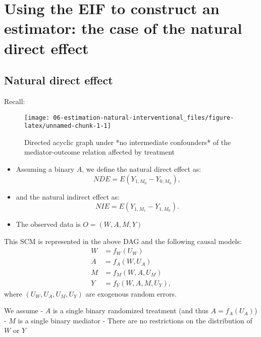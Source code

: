 \documentclass[
  12pt,
]{book}
\theoremstyle{definition}
\theoremstyle{definition}
\theoremstyle{definition}
\newcommand{\1}{\mathbbm{1}}
\begin{document}
\hypertarget{using-the-eif-to-construct-an-estimator-the-case-of-the-natural-direct-effect}{%
\chapter{Using the EIF to construct an estimator: the case of the natural direct effect}\label{using-the-eif-to-construct-an-estimator-the-case-of-the-natural-direct-effect}}

\hypertarget{natural-direct-effect}{%
\section{Natural direct effect}\label{natural-direct-effect}}

Recall:

\begin{figure}

{\centering \texttt{[image: 06-estimation-natural-interventional\_files/figure-latex/unnamed-chunk-1-1]} 

}

\caption{Directed acyclic graph under *no intermediate confounders* of the mediator-outcome relation affected by treatment}\label{fig:unnamed-chunk-1}
\end{figure}

\begin{itemize}
\item
  Assuming a binary \(A\), we define the natural direct effect as: \[NDE = E(Y_{1,M_{0}} - Y_{0,M_{0}}),\]
\item
  and the natural indirect effect as: \[NIE = E(Y_{1,M_{1}} - Y_{1,M_{0}}).\]
\item
  The observed data is \(O=(W, A, M, Y)\)
\end{itemize}

This SCM is represented in the above DAG and the following causal models:
\begin{align*}
  W & = f_W(U_W)\\
  A & = f_A(W, U_A)\\
  M & = f_M(W, A, U_M)\\
  Y & = f_Y(W, A, M, U_Y),
\end{align*}
where \((U_W, U_A,U_M, U_Y)\) are exogenous random errors.

We assume
- \(A\) is a single binary randomized treatment (and thus \(A = f_A(U_A)\))
- \(M\) is a single binary mediator
- There are no restrictions on the distribution of \(W\) or \(Y\)
\end{document}

